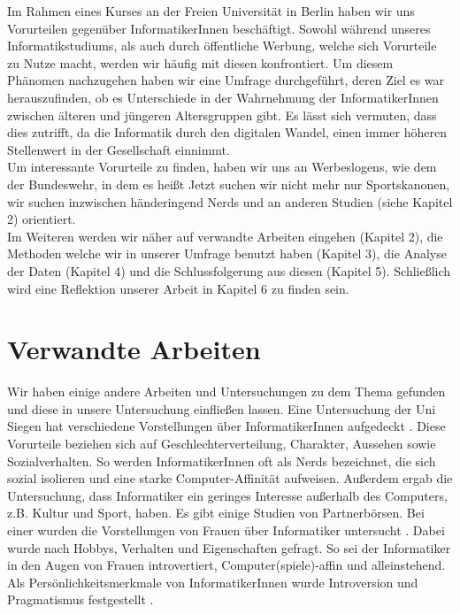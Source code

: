 \documentclass[de]{agse-empir-report}\usepackage[]{graphicx}\usepackage[]{color}
\begin{document}
Im Rahmen eines Kurses an der Freien Universität in Berlin haben wir uns Vorurteilen gegenüber InformatikerInnen beschäftigt. Sowohl während unseres Informatikstudiums, als auch durch öffentliche Werbung, welche sich Vorurteile zu Nutze macht, werden wir häufig mit diesen konfrontiert.
Um diesem Phänomen nachzugehen haben wir eine Umfrage durchgeführt, deren Ziel es war herauszufinden, ob es Unterschiede in der Wahrnehmung der InformatikerInnen zwischen älteren und jüngeren Altersgruppen gibt. Es lässt sich vermuten, dass dies zutrifft, da die Informatik durch den digitalen Wandel, einen immer höheren Stellenwert in der Gesellschaft einnimmt.\\
Um interessante Vorurteile zu finden, haben wir uns an Werbeslogens, wie dem der Bundeswehr, in dem es heißt \glqq Jetzt suchen wir nicht mehr nur Sportskanonen, wir suchen inzwischen händeringend Nerds \grqq \cite{Bundeswehr} und an anderen Studien (siehe Kapitel 2) orientiert. \\
Im Weiteren werden wir näher auf verwandte Arbeiten eingehen (Kapitel 2), die Methoden welche wir in unserer Umfrage benutzt haben (Kapitel 3), die Analyse der Daten (Kapitel 4) und die Schlussfolgerung aus diesen (Kapitel 5). Schließlich wird eine Reflektion unserer Arbeit in Kapitel 6 zu finden sein.

\section[at]{Verwandte Arbeiten}

Wir haben einige andere Arbeiten und Untersuchungen zu dem Thema gefunden und diese in unsere Untersuchung einfließen lassen. Eine Untersuchung der Uni Siegen hat verschiedene Vorstellungen über InformatikerInnen aufgedeckt \cite{Weber09}. Diese Vorurteile beziehen sich auf Geschlechterverteilung, Charakter, Aussehen sowie Sozialverhalten. So werden InformatikerInnen oft als Nerds bezeichnet, die sich sozial isolieren und eine starke Computer-Affinität aufweisen. Außerdem ergab die Untersuchung, dass Informatiker ein geringes Interesse außerhalb des Computers, z.B. Kultur und Sport, haben. 
Es gibt einige Studien von Partnerbörsen. Bei einer wurden die Vorstellungen von Frauen über Informatiker untersucht \cite{partnersuche.de}. Dabei wurde nach Hobbys, Verhalten und Eigenschaften gefragt. So sei der Informatiker in den Augen von Frauen introvertiert, Computer(spiele)-affin und alleinstehend. Als Persönlichkeitsmerkmale von InformatikerInnen wurde Introversion und Pragmatismus festgestellt \cite{parship}.
\end{document}

